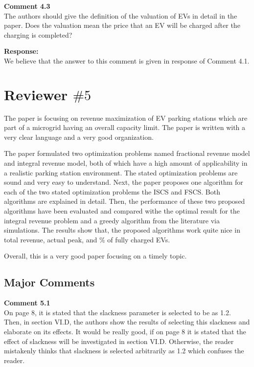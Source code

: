 \documentclass[11pt]{article}
\begin{document}

\vspace{2mm}
{\color{blue}
\noindent\textbf{Comment 4.3}\\
The authors should give the definition of the valuation of EVs in detail in the paper. Does the valuation mean the price that an EV will be charged after the charging is completed?}

\vspace{7mm}
\noindent\textbf{Response:}\\
We believe that the answer to this comment is given in response of Comment 4.1.


\newpage
\section{Reviewer $\# 5$}
{\color{blue}The paper is focusing on revenue maximization of EV parking stations which are part of a microgrid having an overall capacity limit. The paper is written with a very clear language and a very good organization.

The paper formulated two optimization problems named fractional revenue model and integral revenue model, both of which have a high amount of applicability in a realistic parking station environment. The stated optimization problems are sound and very easy to understand. Next, the paper proposes one algorithm for each of the two stated optimization problems the ISCS and FSCS. Both algorithms are explained in detail. Then, the performance of these two proposed algorithms have been evaluated and  compared withe the optimal result for the integral revenue problem and a greedy algorithm from the literature via simulations. The results show that, the proposed algorithms work quite nice in total revenue, actual peak, and \% of fully charged EVs.

Overall, this is a very good paper focusing on a timely topic.}

\subsection{Major Comments}

\vspace{2mm}
{\color{blue}
\noindent\textbf{Comment 5.1}\\
On page 8, it is stated that the slackness parameter is selected to be as 1.2. Then, in section VI.D, the authors show the results of selecting this slackness and elaborate on its effects. It would be really good, if on page 8 it is stated that the effect of slackness will be investigated in section VI.D. Otherwise, the reader mistakenly thinks that slackness is selected arbitrarily as 1.2 which confuses the reader.}
\end{document}
